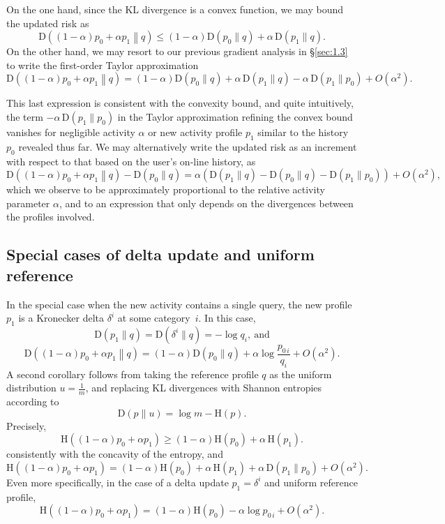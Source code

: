 On the one hand, since the KL divergence is a convex function, we may bound the updated risk as
$$\text{D}\left((1-\alpha)p_0+\alpha p_1\middle\|q\right)\leqslant(1-\alpha)\text{D}(p_0\|q)+\alpha\,\text{D}(p_1\|q).$$
On the other hand, we may resort to our previous gradient analysis in \S \ref{sec:1.3} to write the first\hyp order Taylor approximation
$$\text{D}\left((1-\alpha)p_0+\alpha p_1\middle\|q\right)=(1-\alpha)\text{D}(p_0\|q)+\alpha\,\text{D}(p_1\|q)-\alpha\,\text{D}(p_1\|p_0)+O(\alpha^2).$$

This last expression is consistent with the convexity bound, and quite intuitively, the term $-\alpha\,\text{D}(p_1\|p_0)$ in the Taylor approximation refining the convex bound vanishes for negligible activity $\alpha$ or new activity profile $p_1$ similar to the history $p_0$ revealed thus far. We may alternatively write the updated risk as an increment with respect to that based on the user's on-line history, as
$$\text{D}\left((1-\alpha)p_0+\alpha p_1\middle\|q\right)-\text{D}(p_0\|q)=\alpha\left(\text{D}(p_1\|q)-\text{D}(p_0\|q)-\text{D}(p_1\|p_0)\right)+O(\alpha^2),$$
which we observe to be approximately proportional to the relative activity parameter $\alpha$, and to an expression that only depends on the divergences between the profiles involved.

\subsection{Special cases of delta update and uniform reference}
\label{sec:1.5}

\noindent
In the special case when the new activity contains a single query, the new profile $p_1$ is a Kronecker delta $\delta^i$ at some category~$i$. In this case,
$$\text{D}(p_1\|q)=\text{D}(\delta^i\|q)=-\log q_i,\ \text{and}$$
$$\text{D}\left((1-\alpha)p_0+\alpha p_1\middle\|q\right)=(1-\alpha)\text{D}(p_0\|q)+\alpha\log \frac{p_{0\,i}}{q_i}+O(\alpha^2).$$
A second corollary follows from taking the reference profile $q$ as the uniform distribution $u=\tfrac{1}{m}$, and replacing KL divergences with Shannon entropies according to
$$\text{D}(p\|u)=\log m-\text{H}(p).$$
Precisely,
$$\text{H}\left((1-\alpha)p_0+\alpha p_1\right)\geqslant(1-\alpha)\text{H}(p_0)+\alpha\,\text{H}(p_1).$$
consistently with the concavity of the entropy, and
$$\text{H}\left((1-\alpha)p_0+\alpha p_1\right)=(1-\alpha)\text{H}(p_0)+\alpha\,\text{H}(p_1)+\alpha\,\text{D}(p_1\|p_0)+O(\alpha^2).$$
Even more specifically, in the case of a delta update $p_1=\delta^i$ and uniform reference profile,
$$\text{H}\left((1-\alpha)p_0+\alpha p_1\right)=(1-\alpha)\text{H}(p_0)-\alpha\log p_{0\,i}+O(\alpha^2).$$

